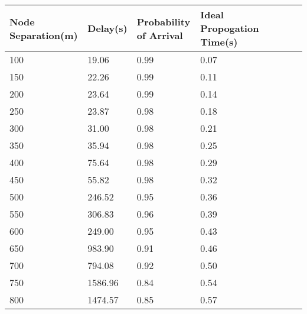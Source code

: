 \begin{tabular}{*{4}{p{1.5cm}l}}
\toprule
 Node Separation(m) &  Delay(s) &  Probability of Arrival &  Ideal Propogation Time(s) \\
\midrule
                100 &     19.06 &                    0.99 &                       0.07 \\
                150 &     22.26 &                    0.99 &                       0.11 \\
                200 &     23.64 &                    0.99 &                       0.14 \\
                250 &     23.87 &                    0.98 &                       0.18 \\
                300 &     31.00 &                    0.98 &                       0.21 \\
                350 &     35.94 &                    0.98 &                       0.25 \\
                400 &     75.64 &                    0.98 &                       0.29 \\
                450 &     55.82 &                    0.98 &                       0.32 \\
                500 &    246.52 &                    0.95 &                       0.36 \\
                550 &    306.83 &                    0.96 &                       0.39 \\
                600 &    249.00 &                    0.95 &                       0.43 \\
                650 &    983.90 &                    0.91 &                       0.46 \\
                700 &    794.08 &                    0.92 &                       0.50 \\
                750 &   1586.96 &                    0.84 &                       0.54 \\
                800 &   1474.57 &                    0.85 &                       0.57 \\
\bottomrule
\end{tabular}
